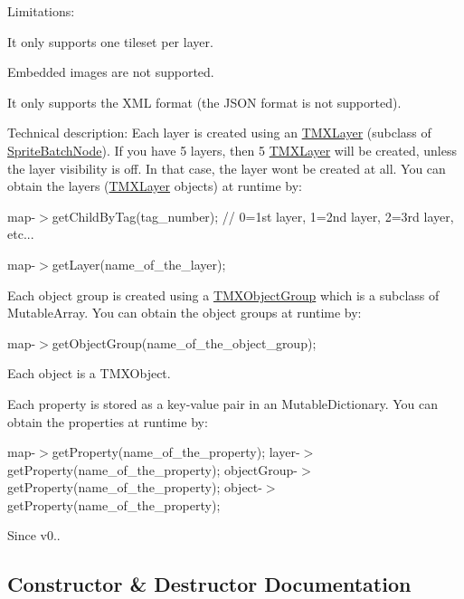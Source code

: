 Limitations\+:
\begin{DoxyItemize}
\item It only supports one tileset per layer.
\item Embedded images are not supported.
\item It only supports the X\+ML format (the J\+S\+ON format is not supported).
\end{DoxyItemize}

Technical description\+: Each layer is created using an \hyperlink{classTMXLayer}{T\+M\+X\+Layer} (subclass of \hyperlink{classSpriteBatchNode}{Sprite\+Batch\+Node}). If you have 5 layers, then 5 \hyperlink{classTMXLayer}{T\+M\+X\+Layer} will be created, unless the layer visibility is off. In that case, the layer won\textquotesingle{}t be created at all. You can obtain the layers (\hyperlink{classTMXLayer}{T\+M\+X\+Layer} objects) at runtime by\+:
\begin{DoxyItemize}
\item map-\/$>$get\+Child\+By\+Tag(tag\+\_\+number); // 0=1st layer, 1=2nd layer, 2=3rd layer, etc...
\item map-\/$>$get\+Layer(name\+\_\+of\+\_\+the\+\_\+layer);
\end{DoxyItemize}

Each object group is created using a \hyperlink{classTMXObjectGroup}{T\+M\+X\+Object\+Group} which is a subclass of Mutable\+Array. You can obtain the object groups at runtime by\+:
\begin{DoxyItemize}
\item map-\/$>$get\+Object\+Group(name\+\_\+of\+\_\+the\+\_\+object\+\_\+group);
\end{DoxyItemize}

Each object is a T\+M\+X\+Object.

Each property is stored as a key-\/value pair in an Mutable\+Dictionary. You can obtain the properties at runtime by\+:

map-\/$>$get\+Property(name\+\_\+of\+\_\+the\+\_\+property); layer-\/$>$get\+Property(name\+\_\+of\+\_\+the\+\_\+property); object\+Group-\/$>$get\+Property(name\+\_\+of\+\_\+the\+\_\+property); object-\/$>$get\+Property(name\+\_\+of\+\_\+the\+\_\+property);

\begin{DoxySince}{Since}
v0.. 
\end{DoxySince}


\subsection{Constructor \& Destructor Documentation}
\mbox{\label{classTMXTiledMap_a4a0406798cb65a4a4dde5f667172965c}} 
